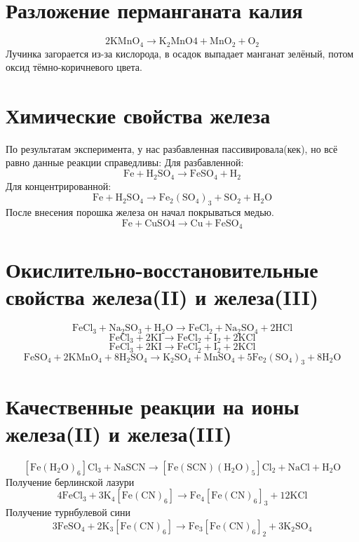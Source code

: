 \documentclass[a4paper,12pt]{article}
\begin{document}
\section{Разложение перманганата калия}
\begin{equation} 
\mathrm{2KMnO_4  \longrightarrow K_2MnO4 + MnO_2 + O_2}
\end{equation}
Лучинка загорается из-за кислорода, в осадок выпадает манганат зелёный, потом оксид тёмно-коричневого цвета.
\section{Химические свойства железа}
По результатам эксперимента, у нас разбавленная пассивировала(кек), но всё равно данные реакции справедливы:
Для разбавленной:
\begin{equation} 
\mathrm{Fe + H_2SO_4  \longrightarrow FeSO_4 + H_2}
\end{equation}
Для концентрированной:
\begin{equation} 
\mathrm{Fe + H_2SO_4  \longrightarrow Fe_2(SO_4)_3 + SO_2 + H_2O}
\end{equation}
После внесения порошка железа он начал покрываться медью.
\begin{equation} 
\mathrm{Fe + CuSO4  \longrightarrow Cu + FeSO_4}
\end{equation}
\section{Окислительно-восстановительные свойства железа(II) и железа(III)}
\begin{equation} 
\mathrm{FeCl_3 + Na_2SO_3 + H_2O  \longrightarrow FeCl_2 + Na_2SO_4 + 2HCl}
\end{equation}
\begin{equation} 
\mathrm{FeCl_3 + 2KI \longrightarrow FeCl_2 +I_2 + 2KCl}
\end{equation}
\begin{equation} 
\mathrm{FeCl_3 + 2KI \longrightarrow FeCl_2 +I_2 + 2KCl}
\end{equation}
\begin{equation} 
\mathrm{FeSO_4 + 2KMnO_4 + 8H_2SO_4 \longrightarrow K_2SO_4 + MnSO_4 + 5Fe_2(SO_4)_3 + 8H_2O}
\end{equation}
\section{Качественные реакции на ионы железа(II) и железа(III)}
\begin{equation} 
\mathrm{[Fe(H_2O)_6]Cl_3 + NaSCN \longrightarrow [Fe(SCN)(H_2O)_5]Cl_2 + NaCl + H_2O}
\end{equation}
Получение берлинской лазури
\begin{equation} 
\mathrm{4FeCl_3 +3 K_4[Fe(CN)_6] \longrightarrow Fe_4[Fe(CN)_6]_3+12KCl }
\end{equation}
Получение турнбулевой сини
\begin{equation} 
\mathrm{3FeSO_4 + 2K_3[Fe(CN)_6] \longrightarrow Fe_3[Fe(CN)_6]_2+3K_2SO_4 }
\end{equation}
\end{document}
